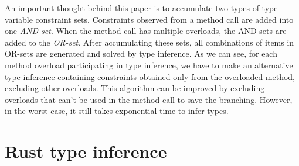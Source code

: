 An important thought behind this paper is to accumulate two types of type variable constraint sets.
Constraints observed from a method call are added into one \textit{AND-set}.
When the method call has multiple overloads, the AND-sets are added to the \textit{OR-set}.
After accumulating these sets, all combinations of items in OR-sets are generated and solved by type inference.
As we can see, for each method overload participating in type inference, we have to make an alternative type inference containing constraints obtained only from the overloaded method, excluding other overloads.
This algorithm can be improved by excluding overloads that can't be used in the method call to save the branching.
However, in the worst case, it still takes exponential time to infer types.

\section{Rust type inference}

